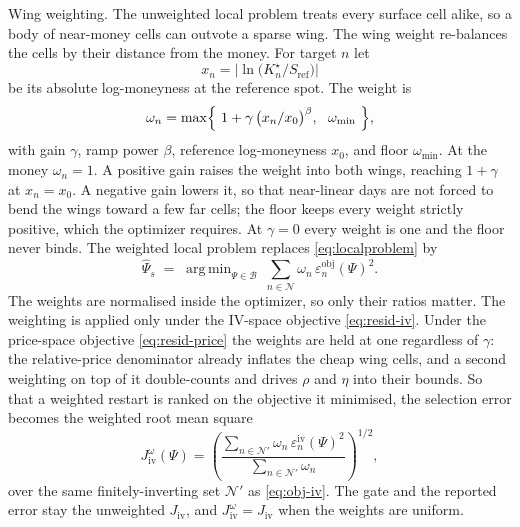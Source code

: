 \documentclass[a4paper, 11pt, reqno]{amsart}
\makeatletter
\def\paragraph{\@startsection{paragraph}{4}%
	\z@\z@{-\fontdimen2\font}%
	{\normalfont\bfseries}}
\DeclareMathOperator*{\argmin}{arg\,min}
\newcommand{\ConstWingGainSym}{\gamma}                   \newcommand{\ConstWingGainVal}{0.0}
\newcommand{\ConstWingPowerSym}{\beta}                   \newcommand{\ConstWingPowerVal}{1.0}
\newcommand{\ConstWingScaleSym}{x_0}                     \newcommand{\ConstWingScaleVal}{0.05}
\newcommand{\ConstWingFloorSym}{\omega_{\min}}           \newcommand{\ConstWingFloorVal}{10^{-3}}
\makeatother
\begin{document}
		\paragraph{Wing weighting.} The unweighted local problem treats every surface cell alike, so a
		body of near-money cells can outvote a sparse wing. The wing weight re-balances the cells by
		their distance from the money. For target $n$ let
		\begin{equation}\label{eq:wing-x}
			x_n = \bigl|\ln\bigl(K^\star_n / S_{\mathrm{ref}}\bigr)\bigr|
		\end{equation}
		be its absolute log-moneyness at the reference spot. The weight is
		\begin{equation}\label{eq:wing-weight}
			\omega_n = \max\Bigl\{\ 1 + \ConstWingGainSym\,\bigl(x_n / \ConstWingScaleSym\bigr)^{\ConstWingPowerSym},\ \ \ConstWingFloorSym\ \Bigr\},
		\end{equation}
		with gain $\ConstWingGainSym$, ramp power $\ConstWingPowerSym$, reference log-moneyness
		$\ConstWingScaleSym$, and floor $\ConstWingFloorSym$. At the money $\omega_n=1$. A positive gain
		raises the weight into both wings, reaching $1+\ConstWingGainSym$ at
		$x_n=\ConstWingScaleSym$. A negative gain lowers it, so that near-linear days are not forced to
		bend the wings toward a few far cells; the floor keeps every weight strictly positive, which the
		optimizer requires. At $\ConstWingGainSym=0$ every weight is one and the floor never binds. The
		weighted local problem replaces \eqref{eq:localproblem} by
		\begin{equation}\label{eq:localproblem-w}
			\widehat\Psi_s \;=\; \argmin_{\Psi \in \mathcal{B}}\ \sum_{n\in\mathcal{N}} \omega_n\,\varepsilon^{\mathrm{obj}}_n(\Psi)^2 .
		\end{equation}
		The weights are normalised inside the optimizer, so only their ratios matter. The weighting is
		applied only under the IV-space objective \eqref{eq:resid-iv}. Under the price-space objective
		\eqref{eq:resid-price} the weights are held at one regardless of $\ConstWingGainSym$: the
		relative-price denominator already inflates the cheap wing cells, and a second weighting on top
		of it double-counts and drives $\rho$ and $\eta$ into their bounds. So that a weighted restart is
		ranked on the objective it minimised, the selection error becomes the weighted root mean square
		\begin{equation}\label{eq:obj-iv-w}
			J^{\omega}_{\mathrm{iv}}(\Psi)
			= \left( \frac{\sum_{n\in\mathcal{N}'} \omega_n\,\varepsilon^{\mathrm{iv}}_n(\Psi)^2}{\sum_{n\in\mathcal{N}'} \omega_n} \right)^{1/2},
		\end{equation}
		over the same finitely-inverting set $\mathcal{N}'$ as \eqref{eq:obj-iv}. The gate and the
		reported error stay the unweighted $J_{\mathrm{iv}}$, and $J^{\omega}_{\mathrm{iv}}=J_{\mathrm{iv}}$
		when the weights are uniform.
\end{document}
